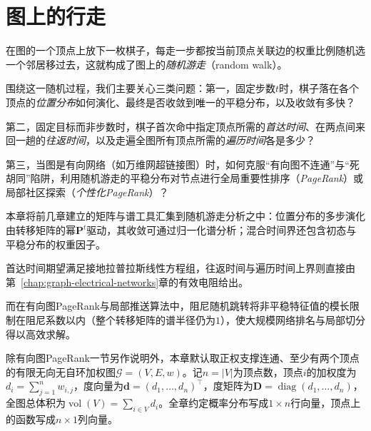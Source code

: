 \chapter{图上的行走}
\label{chap:graph-walks}

在图的一个顶点上放下一枚棋子，每走一步都按当前顶点关联边的权重比例随机选一个邻居移过去，这就构成了图上的\emph{随机游走}（random walk）。

围绕这一随机过程，我们主要关心三类问题：第一，固定步数$t$时，棋子落在各个顶点的\emph{位置分布}如何演化、最终是否收敛到唯一的平稳分布，以及收敛有多快？

第二，固定目标而非步数时，棋子首次命中指定顶点所需的\emph{首达时间}、在两点间来回一趟的\emph{往返时间}，以及走遍全图所有顶点所需的\emph{遍历时间}各是多少？

第三，当图是有向网络（如万维网超链接图）时，如何克服“有向图不连通”与“死胡同”陷阱，利用随机游走的平稳分布对节点进行全局重要性排序（\emph{PageRank}）或局部社区探索（\emph{个性化PageRank}）？

本章将前几章建立的矩阵与谱工具汇集到随机游走分析之中：位置分布的多步演化由转移矩阵的幂$\bm P^t$驱动，其收敛可通过归一化谱分析；混合时间界还包含初态与平稳分布的权重因子。

首达时间期望满足接地拉普拉斯线性方程组，往返时间与遍历时间上界则直接由第~\ref{chap:graph-electrical-networks}章的有效电阻给出。

而在有向图PageRank与局部推送算法中，阻尼随机跳转将非平稳特征值的模长限制在阻尼系数以内（整个转移矩阵的谱半径仍为$1$），使大规模网络排名与局部切分得以高效求解。

除有向图PageRank一节另作说明外，本章默认取正权支撑连通、至少有两个顶点的有限无向无自环加权图$\mathcal G=(V,E,w)$。记$n=|V|$为顶点数，顶点$i$的加权度为$d_i=\sum_{j=1}^n w_{i,j}$，度向量为$\bm{d}=(d_1,\ldots,d_n)^\top$，度矩阵为$\bm{D}=\operatorname{diag}(d_1,\ldots,d_n)$，全图总体积为$\operatorname{vol}(V)=\sum_{i\in V}d_i$。全章约定概率分布写成$1\times n$行向量，顶点上的函数写成$n\times 1$列向量。








